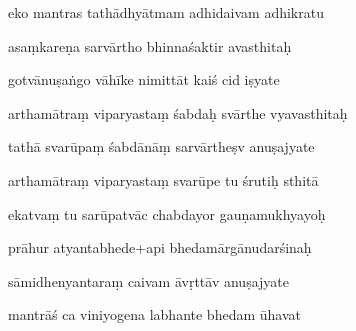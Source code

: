 \documentclass[article,12pt,a4paper]{memoir}%
\newcounter{parCount}
\begin{document}
	  
	  \pstart {} eko mantras tathādhyātmam adhidaivam adhikratu 
	{}
	\pend%
      

	  
	  \pstart \leavevmode%
	asaṃkareṇa sarvārtho bhinnaśaktir avasthitaḥ 
	{}
	\pend%
      

	  
	  \pstart {} gotvānuṣaṅgo vāhīke nimittāt kaiś cid iṣyate 
	{}
	\pend%
      

	  
	  \pstart \leavevmode%
	arthamātraṃ viparyastaṃ śabdaḥ svārthe vyavasthitaḥ 
	{}
	\pend%
      

	  
	  \pstart {} tathā svarūpaṃ śabdānāṃ sarvārtheṣv anuṣajyate 
	{}
	\pend%
      

	  
	  \pstart \leavevmode%
	arthamātraṃ viparyastaṃ svarūpe tu śrutiḥ sthitā 
	{}
	\pend%
      

	  
	  \pstart {} ekatvaṃ tu sarūpatvāc chabdayor gauṇamukhyayoḥ 
	{}
	\pend%
      

	  
	  \pstart \leavevmode%
	prāhur atyantabhede+api bhedamārgānudarśinaḥ 
	{}
	\pend%
      

	  
	  \pstart {} sāmidhenyantaraṃ caivam āvṛttāv anuṣajyate 
	{}
	\pend%
      

	  
	  \pstart \leavevmode%
	mantrāś ca viniyogena labhante bhedam ūhavat 
	{}
	\pend%
      
\end{document}
